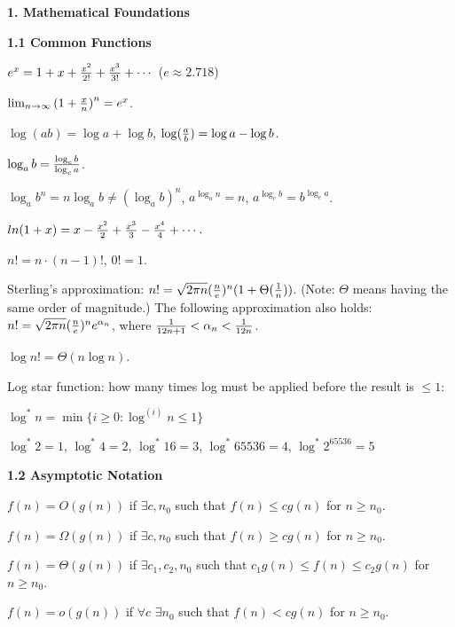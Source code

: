 \documentclass[8pt]{minimal}
\begin{document}
\begin{flushleft}
\begin{multicols}{3}


    \textbf{1. Mathematical Foundations}

    \textbf{1.1 Common Functions}

$e^x=1+x+{x^2\over 2!}+{x^3\over 3!}+\cdots$ ($e \approx 2.718$)

$\lim_{n\to\infty}{(1+{x\over n})}^n=e^x$.

$\log(ab)=\log a+\log b$, $\log ({a\over b})=\log a-\log b$.

$\log_a b={{\log_c b}\over {\log_c a}}$.

$\log_a b^n=n\log_a b\not={(\log_a b)}^n$, $a^{\log_a n}=n$,
$a^{\log_c b}=b^{\log_c a}$.

$ln(1+x)=x-{x^2\over 2}+{x^3\over 3}-{x^4\over 4}+\cdots$.

$n!=n\cdot (n-1)!$, $0!=1$.

Sterling's approximation: $n!=\sqrt{2\pi n}({n\over e})^n(1+
\Theta({1\over n}))$. (Note: $\Theta$ means having the same order of 
magnitude.) The following approximation also holds:
$n!=\sqrt{2\pi n}({n\over e})^ne^{\alpha_n}$, where
${1\over 12n+1}<\alpha_n<{1\over 12n}$.

$\log n!=\Theta(n\log n)$.

Log star function: how many times log must be applied before the result is $\le 1$:

$\log^* n=\min\{i\ge0:\log^{(i)}n\le1\}$

$\log^*2=1$, $\log^* 4=2$, $\log^*16=3$, $\log^*65536=4$, $\log^*2^{65536}=5$

    \textbf{1.2 Asymptotic Notation}


\item $f(n)=O(g(n))$ if $\exists c, n_0$ such that 
$f(n)\le cg(n)$ for $n\ge n_0$.

\item $f(n)=\Omega(g(n))$ if $\exists c, n_0$ such that
$f(n)\ge cg(n)$ for $n\ge n_0$.

\item $f(n)=\Theta(g(n))$ if $\exists c_1, c_2, n_0$ such that
$c_1g(n)\le f(n)\le c_2g(n)$ for $n\ge n_0$.

\item $f(n)=o(g(n))$ if $\forall c$ $\exists n_0$ such that
$f(n)<cg(n)$ for $n\ge n_0$. 


\end{multicols}
\end{flushleft}
\end{document}
